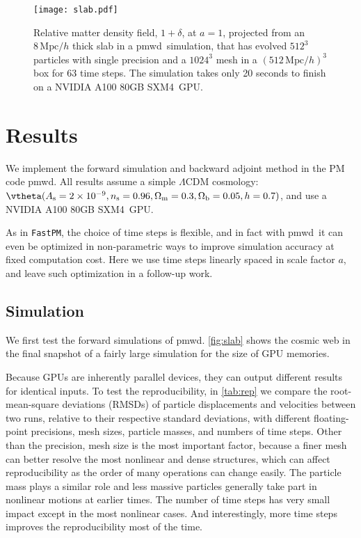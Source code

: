 \documentclass[modern, trackchanges, dvipsnames]{aastex631}
\newcommand{\pmwd}{{\usefont{T1}{nova}{m}{sl}pmwd}}
\newcommand{\As}{A_\mathrm{s}}
\newcommand{\ns}{n_\mathrm{s}}
\newcommand{\Omegam}{\Omega_\mathrm{m}}
\newcommand{\Omegab}{\Omega_\mathrm{b}}
\newcommand{\Mpc}{\mathrm{Mpc}}
\newcommand{\GPU}{NVIDIA A100 80GB SXM4}
\begin{document}
\begin{figure}[t]
\centering
\texttt{[image: slab.pdf]}
\caption{Relative matter density field, $1+\delta$, at $a=1$, projected
from an $8\,\Mpc/h$ thick slab in a \pmwd\ simulation, that has evolved
$512^3$ particles with single precision and a $1024^3$ mesh in a
$(512\,\Mpc/h)^3$ box for 63 time steps.
The simulation takes only 20 seconds to finish on a \GPU\ GPU.
}
\label{fig:slab}
\end{figure}


\vspace{1em}
\section{Results}

We implement the forward simulation and backward adjoint method in the
PM code \pmwd.
All results assume a simple $\Lambda$CDM cosmology: $\vtheta (\As =
2\times10^{-9}, \ns = 0.96, \Omegam = 0.3, \Omegab = 0.05, h = 0.7)$,
and use a \GPU\ GPU.

As in \texttt{FastPM}, the choice of time steps is flexible, and in fact
with \pmwd\ it can even be optimized in non-parametric ways to improve
simulation accuracy at fixed computation cost.
Here we use time steps linearly spaced in scale factor $a$, and leave
such optimization in a follow-up work.


\vspace{1em}
\subsection{Simulation}

We first test the forward simulations of \pmwd.
\autoref{fig:slab} shows the cosmic web in the final snapshot of a
fairly large simulation for the size of GPU memories.

Because GPUs are inherently parallel devices, they can output different
results for identical inputs.
To test the reproducibility, in \autoref{tab:rep} we compare the
root-mean-square deviations (RMSDs) of particle displacements and
velocities between two runs, relative to their respective standard
deviations, with different floating-point precisions, mesh sizes,
particle masses, and numbers of time steps.
Other than the precision, mesh size is the most important factor,
because a finer mesh can better resolve the most nonlinear and dense
structures, which can affect reproducibility as the order of many
operations can change easily.
The particle mass plays a similar role and less massive particles
generally take part in nonlinear motions at earlier times.
The number of time steps has very small impact except in the most
nonlinear cases.
And interestingly, more time steps improves the reproducibility most of
the time.
\end{document}
